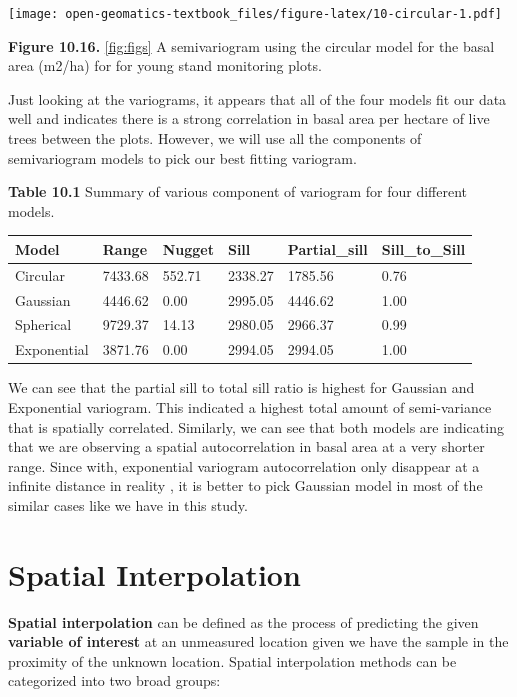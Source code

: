 \documentclass[
]{book}
\begin{document}
\texttt{[image: open-geomatics-textbook\_files/figure-latex/10-circular-1.pdf]}

\textbf{Figure 10.16.} \ref{fig:figs} A semivariogram using the circular model for the basal area (m2/ha) for for young stand monitoring plots.

Just looking at the variograms, it appears that all of the four models fit our data well and indicates there is a strong correlation in basal area per hectare of live trees between the plots. However, we will use all the components of semivariogram models to pick our best fitting variogram.

\textbf{Table 10.1} Summary of various component of variogram for four different models.

\begin{tabular}{l|l|l|l|l|l}
\hline
Model & Range & Nugget & Sill & Partial\_sill & Sill\_to\_Sill\\
\hline
Circular & 7433.68 & 552.71 & 2338.27 & 1785.56 & 0.76\\
\hline
Gaussian & 4446.62 & 0.00 & 2995.05 & 4446.62 & 1.00\\
\hline
Spherical & 9729.37 & 14.13 & 2980.05 & 2966.37 & 0.99\\
\hline
Exponential & 3871.76 & 0.00 & 2994.05 & 2994.05 & 1.00\\
\hline
\end{tabular}

We can see that the partial sill to total sill ratio is highest for Gaussian and Exponential variogram. This indicated a highest total amount of semi-variance that is spatially correlated. Similarly, we can see that both models are indicating that we are observing a spatial autocorrelation in basal area at a very shorter range. Since with, exponential variogram autocorrelation only disappear at a infinite distance in reality , it is better to pick Gaussian model in most of the similar cases like we have in this study.

\hypertarget{spatial-interpolation}{%
\section{Spatial Interpolation}\label{spatial-interpolation}}

\textbf{Spatial interpolation} can be defined as the process of predicting the given \textbf{variable of interest} at an unmeasured location given we have the sample in the proximity of the unknown location. Spatial interpolation methods can be categorized into two broad groups:
\end{document}
